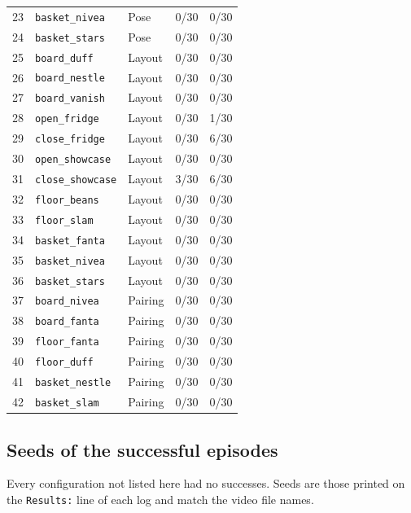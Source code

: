 {\begin{longtable}{rllcc}
23 & \texttt{basket\_nivea} & Pose & 0/30 & 0/30 \\
24 & \texttt{basket\_stars} & Pose & 0/30 & 0/30 \\
\midrule
25 & \texttt{board\_duff} & Layout & 0/30 & 0/30 \\
26 & \texttt{board\_nestle} & Layout & 0/30 & 0/30 \\
27 & \texttt{board\_vanish} & Layout & 0/30 & 0/30 \\
28 & \texttt{open\_fridge} & Layout & 0/30 & 1/30 \\
29 & \texttt{close\_fridge} & Layout & 0/30 & 6/30 \\
30 & \texttt{open\_showcase} & Layout & 0/30 & 0/30 \\
31 & \texttt{close\_showcase} & Layout & 3/30 & 6/30 \\
32 & \texttt{floor\_beans} & Layout & 0/30 & 0/30 \\
33 & \texttt{floor\_slam} & Layout & 0/30 & 0/30 \\
34 & \texttt{basket\_fanta} & Layout & 0/30 & 0/30 \\
35 & \texttt{basket\_nivea} & Layout & 0/30 & 0/30 \\
36 & \texttt{basket\_stars} & Layout & 0/30 & 0/30 \\
\midrule
37 & \texttt{board\_nivea} & Pairing & 0/30 & 0/30 \\
38 & \texttt{board\_fanta} & Pairing & 0/30 & 0/30 \\
39 & \texttt{floor\_fanta} & Pairing & 0/30 & 0/30 \\
40 & \texttt{floor\_duff} & Pairing & 0/30 & 0/30 \\
41 & \texttt{basket\_nestle} & Pairing & 0/30 & 0/30 \\
42 & \texttt{basket\_slam} & Pairing & 0/30 & 0/30 \\
\end{longtable}}

\subsection*{Seeds of the successful episodes}

Every configuration not listed here had no successes. Seeds are those printed on the \texttt{Results:} line of each log and match the video file names.

